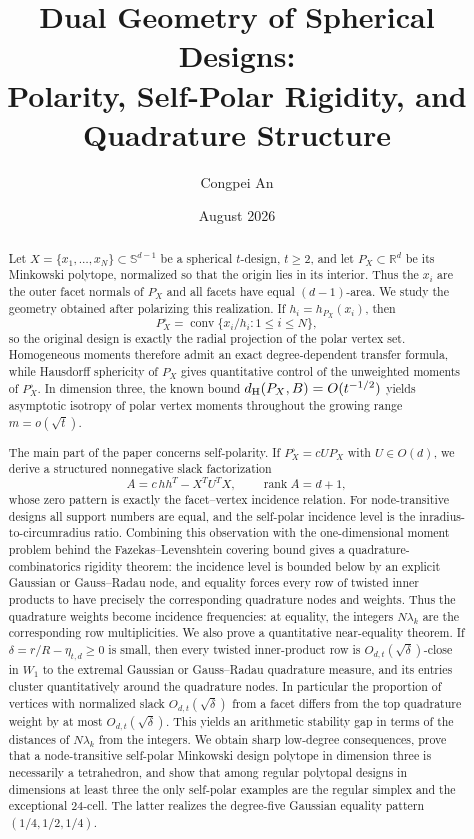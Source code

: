 \documentclass[11pt]{amsart}
\title[Dual Geometry of Spherical Designs]{Dual Geometry of Spherical Designs:\\
Polarity, Self-Polar Rigidity, and Quadrature Structure}
\author{Congpei An}
\date{August 2026}
\theoremstyle{definition}
\theoremstyle{remark}
\newcommand{\R}{\mathbb R}
\newcommand{\Sph}{\mathbb S}
\newcommand{\conv}{\operatorname{conv}}
\newcommand{\rank}{\operatorname{rank}}
\begin{document}
\begin{abstract}
Let $X=\{x_1,\ldots,x_N\}\subset\Sph^{d-1}$ be a spherical $t$-design, $t\ge2$, and let $P_X\subset\R^d$ be its Minkowski polytope, normalized so that the origin lies in its interior.  Thus the $x_i$ are the outer facet normals of $P_X$ and all facets have equal $(d-1)$-area.  We study the geometry obtained after polarizing this realization.  If $h_i=h_{P_X}(x_i)$, then
\[
 P_X^\circ=\conv\{x_i/h_i:1\le i\le N\},
\]
so the original design is exactly the radial projection of the polar vertex set.  Homogeneous moments therefore admit an exact degree-dependent transfer formula, while Hausdorff sphericity of $P_X$ gives quantitative control of the unweighted moments of $P_X^\circ$.  In dimension three, the known bound $d_{\rm H}(P_X,B)=O(t^{-1/2})$ yields asymptotic isotropy of polar vertex moments throughout the growing range $m=o(\sqrt t)$.

The main part of the paper concerns self-polarity.  If $P_X^\circ=cUP_X$ with $U\in O(d)$, we derive a structured nonnegative slack factorization
\[
 A=c\,hh^T-X^TU^TX,
 \qquad \rank A=d+1,
\]
whose zero pattern is exactly the facet--vertex incidence relation.  For node-transitive designs all support numbers are equal, and the self-polar incidence level is the inradius-to-circumradius ratio.  Combining this observation with the one-dimensional moment problem behind the Fazekas--Levenshtein covering bound gives a quadrature-combinatorics rigidity theorem: the incidence level is bounded below by an explicit Gaussian or Gauss--Radau node, and equality forces every row of twisted inner products to have precisely the corresponding quadrature nodes and weights.  Thus the quadrature weights become incidence frequencies: at equality, the integers $N\lambda_k$ are the corresponding row multiplicities.  We also prove a quantitative near-equality theorem.  If $\delta=r/R-\eta_{t,d}\ge0$ is small, then every twisted inner-product row is $O_{d,t}(\sqrt\delta)$-close in $W_1$ to the extremal Gaussian or Gauss--Radau quadrature measure, and its entries cluster quantitatively around the quadrature nodes.  In particular the proportion of vertices with normalized slack $O_{d,t}(\sqrt\delta)$ from a facet differs from the top quadrature weight by at most $O_{d,t}(\sqrt\delta)$.  This yields an arithmetic stability gap in terms of the distances of $N\lambda_k$ from the integers.  We obtain sharp low-degree consequences, prove that a node-transitive self-polar Minkowski design polytope in dimension three is necessarily a tetrahedron, and show that among regular polytopal designs in dimensions at least three the only self-polar examples are the regular simplex and the exceptional $24$-cell.  The latter realizes the degree-five Gaussian equality pattern $(1/4,1/2,1/4)$.
\end{abstract}
\end{document}
